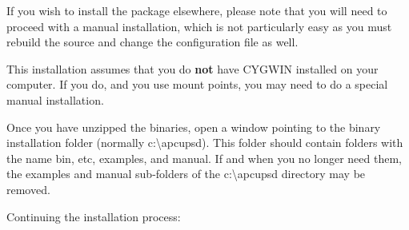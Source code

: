 If you wish to install the package elsewhere, please note that you will need
to proceed with a manual installation, which is not particularly easy as you
must rebuild the source and change the configuration file as well.  

This installation assumes that you do {\bf not} have CYGWIN installed on your
computer. If you do, and you use mount points, you may need to do a special
manual installation.  

Once you have unzipped the binaries, open a window pointing to the binary
installation folder (normally c:\textbackslash{}apcupsd). This folder should
contain folders with the name bin, etc, examples, and manual. If and when you
no longer need them, the examples and manual sub-folders of the
c:\textbackslash{}apcupsd directory may be removed.  

Continuing the installation process:  


